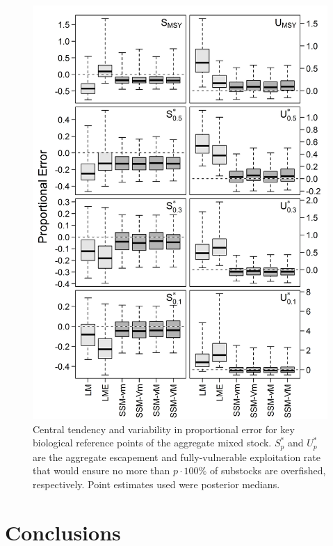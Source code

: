 \documentclass[12pt,]{book}
\theoremstyle{definition}
\theoremstyle{definition}
\theoremstyle{definition}
\theoremstyle{remark}
\begin{document}
\begin{figure}
  \centering
  \includegraphics{img/Ch4/ref-point-bias.jpg}
  \caption{Central tendency and variability in proportional error for key biological reference points of the aggregate mixed stock. $S^*_p$ and $U^*_p$ are the aggregate escapement and fully-vulnerable exploitation rate that would ensure no more than $p \cdot 100\%$ of substocks are overfished, respectively. Point estimates used were posterior medians.}
  \label{fig:ref-point-bias}
\end{figure}

\doublespacing

\chapter{Conclusions}\label{ch5}
\end{document}
